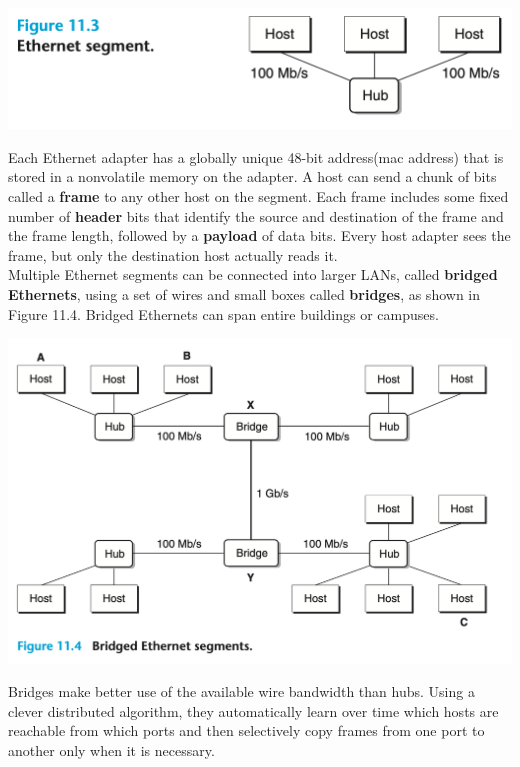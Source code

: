 \documentclass[11pt]{article}
\begin{document}
\begin{center}
\includegraphics[width=.9\linewidth]{pics/figure11.3-ethenet-segment.png}
\end{center}

Each Ethernet adapter has a globally unique 48-bit address(mac address) that is stored in a nonvolatile memory on the adapter. A host can send a chunk of bits called a \textbf{frame} to any other host on the segment. Each frame includes some fixed number of \textbf{header} bits that identify the source and destination of the frame and the frame length, followed by a \textbf{payload} of data bits. Every host adapter sees the frame, but only the destination host actually reads it.\\

Multiple Ethernet segments can be connected into larger LANs, called \textbf{bridged Ethernets}, using a set of wires and small boxes called \textbf{bridges}, as shown in Figure 11.4. Bridged Ethernets can span entire buildings or campuses.\\

\begin{center}
\includegraphics[width=.9\linewidth]{pics/figure11.4-bridged-ethenet-segment.png}
\end{center}

Bridges make better use of the available wire bandwidth than hubs. Using a clever distributed algorithm, they automatically learn over time which hosts are reachable from which ports and then selectively copy frames from one port to another only when it is necessary.\\
\end{document}
